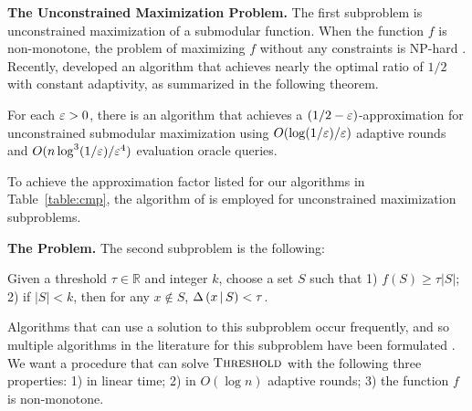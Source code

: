 \textbf{The Unconstrained Maximization Problem.} 
The first subproblem is unconstrained maximization
of a submodular function.
When the function
$f$ is non-monotone, the problem of maximizing $f$ without
any constraints is NP-hard \cite{Feige2011}.
Recently,  developed an algorithm that achieves
nearly the optimal ratio of $1/2$ with constant adaptivity, as summarized in the
following theorem. 
\begin{theorem} \label{lemm:unc}
  For each $\varepsilon > 0$,
  there is an algorithm that
  achieves a $(1/2 - \varepsilon)$-approximation
  for unconstrained submodular maximization using
  $O( \log (1/\varepsilon ) / \varepsilon )$ adaptive rounds 
  and $O( n \log^3 (1/ \varepsilon ) / \varepsilon^4 )$ evaluation
  oracle queries.
\end{theorem}
\noindent To achieve the approximation factor listed for
our algorithms in
Table~\ref{table:cmp}, the algorithm of  is employed
for unconstrained maximization subproblems.

\textbf{The \tp Problem.}
The second subproblem is the following:
\begin{definition}[\tp]
  Given a threshold $\tau \in \mathbb R$ and integer $k$,
choose a set $S$ such that 1) $f(S) \ge \tau |S|$; 2)
if $|S| < k$, then
for any $x \not \in S$, $\Delta \left( x \, | \, S \right) < \tau$.
\end{definition}
Algorithms that can use a solution to this
subproblem occur frequently, and so
multiple algorithms in the literature
for this subproblem
have been formulated
\cite{Fahrbach2018,Kazemi2019,amanatidis2021submodular,chen2021best}.
We want a procedure that can solve
$\textsc{Threshold}$ with the following three properties:
1) in linear time; 2) in $O( \log n )$
adaptive rounds; 3) the function $f$ is non-monotone.

